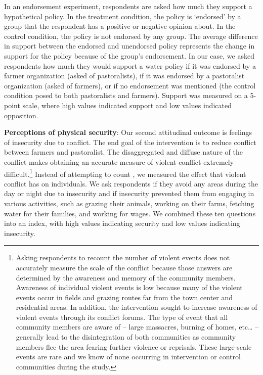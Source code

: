 \documentclass[11pt]{article}
\begin{document}
In an endorsement experiment, respondents are asked how much they
support a hypothetical policy. In the treatment condition, the policy is
`endorsed' by a group that the respondent has a positive or negative
opinion about. In the control condition, the policy is not endorsed by
any group. The average difference in support between the endorsed and
unendorsed policy represents the change in support for the policy
because of the group's endorsement. In our case, we asked respondents
how much they would support a water policy if it was endorsed by a
farmer organization (asked of pastoralists), if it was endorsed by a
pastoralist organization (asked of farmers), or if no endorsement was
mentioned (the control condition posed to both pastoralists and
farmers). Support was measured on a 5-point scale, where high values
indicated support and low values indicated opposition.

\textbf{Perceptions of physical security}: Our second attitudinal
outcome is feelings of insecurity due to conflict. The end goal of the
intervention is to reduce conflict between farmers and pastoralist. The
disaggregated and diffuse nature of the conflict makes obtaining an
accurate measure of violent conflict extremely difficult.\footnote{Asking
  respondents to recount the number of violent events does not
  accurately measure the scale of the conflict because those answers are
  determined by the awareness and memory of the community members.
  Awareness of individual violent events is low because many of the
  violent events occur in fields and grazing routes far from the town
  center and residential areas. In addition, the intervention sought to
  increase awareness of violent events through its conflict forums. The
  type of event that all community members are aware of -- large
  massacres, burning of homes, etc\ldots{} -- generally lead to the
  disintegration of both communities as community members flee the area
  fearing further violence or reprisals. These large-scale events are
  rare and we know of none occurring in intervention or control
  communities during the study.} Instead of attempting to count , we
measured the effect that violent conflict has on individuals. We ask
respondents if they avoid any areas during the day or night due to
insecurity and if insecurity prevented them from engaging in various
activities, such as grazing their animals, working on their farms,
fetching water for their families, and working for wages. We combined
these ten questions into an index, with high values indicating security
and low values indicating insecurity.
\end{document}
